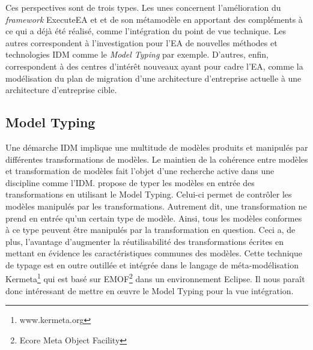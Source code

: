 Ces perspectives sont de trois types. Les unes concernent l'amélioration du \emph{framework} ExecuteEA et 
et de son métamodèle en apportant des compléments à ce qui a déjà été réalisé, comme l'intégration
du point de vue technique. Les autres correspondent à l'investigation pour l'EA
de nouvelles méthodes et technologies IDM comme le \emph{Model Typing} par exemple. D'autres, enfin,
correspondent à des centres d'intérêt nouveaux ayant pour cadre l'EA, comme la modélisation du plan de migration
d'une architecture d'entreprise actuelle à une architecture d'entreprise cible. 



\subsection{Model Typing}


Une démarche IDM implique une multitude de modèles produits et manipulés par différentes transformations de modèles. Le maintien de la cohérence entre modèles et transformation de modèles fait l'objet d'une recherche active dans une discipline comme l'IDM. \cite{steel2007model} propose de typer les modèles en entrée des transformations en utilisant le Model Typing. Celui-ci permet de contrôler les modèles manipulés par les transformations. Autrement dit, une transformation ne prend en entrée qu'un certain type de modèle. Ainsi, tous les modèles conformes à ce type peuvent être manipulés par la transformation en question. Ceci a, de plus, l'avantage d'augmenter la réutilisabilité des transformations écrites en mettant en évidence les caractéristiques communes des modèles. Cette technique de typage est en outre outillée et intégrée dans le langage de méta-modélisation Kermeta\footnote{www.kermeta.org} qui est basé sur EMOF\footnote{Ecore Meta Object Facility} dans un environnement Eclipse. Il nous paraît donc intéressant de mettre en œuvre le Model Typing pour la vue intégration.

